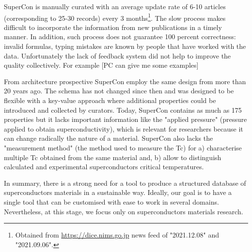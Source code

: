 \documentclass{article}
\begin{document}

SuperCon is manually curated with an average update rate of 6-10 articles (corresponding to 25-30 records) every 3 months\footnote{Obtained from \url{https://dice.nims.go.jp} news feed of "2021.12.08" and "2021.09.06".}. 
The slow process makes difficult to incorporate the information from new publications in a timely manner.
In addition, such process does not guarantee 100 percent correctness: invalid formulas, typing mistakes are known by people that have worked with the data. Unfortunately the lack of feedback system did not help to improve the quality collectively. 
For example [PC can give me some examples]

From architecture prospective SuperCon employ the same design from more than 20 years ago. The schema has not changed since then and was designed to be flexible with a key-value approach where additional properties could be introduced and collected by curators.
Today, SuperCon contains as much as 175 properties but it lacks important information like the "applied pressure" (pressure applied to obtain superconductivity), which is relevant for researchers because it can change radically the nature of a material. 
SuperCon also lacks the "measurement method" (the method used to measure the Tc) for a) characterise multiple Tc obtained from the same material and, b) allow to distinguish calculated and experimental superconductors critical temperatures. 

In summary, there is a strong need for a tool to produce a structured database of superconductors materials in a sustainable way. 
Ideally, our goal is to have a single tool that can be customised with ease to work in several domains. Nevertheless, at this stage, we focus only on superconductors materials research. 
\end{document}
